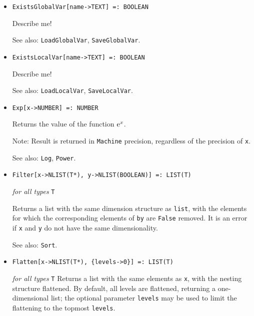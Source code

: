 \begin{itemize}
\item{}
\protect \large \begin{verbatim}
ExistsGlobalVar[name->TEXT] =: BOOLEAN
\end{verbatim} \normalsize

\bd
Describe me!
\item [See also:] \verb+LoadGlobalVar+, \verb+SaveGlobalVar+.
\ed

\item{}
\protect \large \begin{verbatim}
ExistsLocalVar[name->TEXT] =: BOOLEAN
\end{verbatim} \normalsize

\bd
Describe me!
\item [See also:] \verb+LoadLocalVar+, \verb+SaveLocalVar+.
\ed

\item{}
\protect \large \begin{verbatim}
Exp[x->NUMBER] =: NUMBER 
\end{verbatim} \normalsize

\bd
Returns the value of the function ${\rm e}^{x}$.
\item [Note:] Result is returned in \verb+Machine+ precision, regardless
of the precision of \verb+x+.
\item [See also:] \verb+Log+, \verb+Power+.
\ed



\item{}
\protect \large \begin{verbatim}
Filter[x->NLIST(T*), y->NLIST(BOOLEAN)] =: LIST(T)
\end{verbatim} \normalsize

{\it for all types} {\tt T}

\bd
Returns a list with the same dimension structure as \verb+list+, with the
elements for which the corresponding elements of \verb+by+ are \verb+False+
removed.  It is an error if \verb+x+ and \verb+y+ do not have the same
dimensionality.
\item [See also:] \verb+Sort+.
\ed

\item{}
\protect \large \begin{verbatim}
Flatten[x->NLIST(T*), {levels->0}] =: LIST(T) 
\end{verbatim} \normalsize

{\it for all types} {\tt T}
\bd
Returns a list with the same elements as \verb+x+, with the nesting
structure flattened.  By default, all levels are flattened, returning
a one-dimensional list; the optional parameter \verb+levels+ may be
used to limit the flattening to the topmost \verb+levels+.
\ed


\end{itemize}
